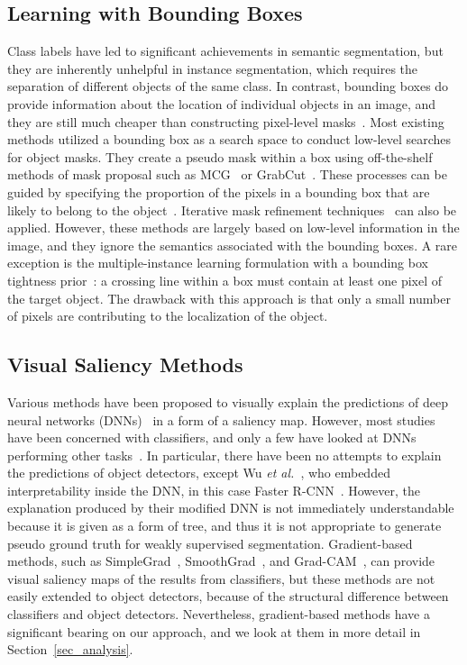 \documentclass[final]{cvpr}
\begin{document}
\subsection{Learning with Bounding Boxes}\label{W_boxes}
Class labels have led to significant achievements in semantic segmentation, but they are inherently unhelpful in instance segmentation, which requires the separation of different objects of the same class.
In contrast, bounding boxes do provide information about the location of individual objects in an image, and they are still much cheaper than constructing pixel-level masks~\cite{bellver2019budget}.
Most existing methods utilized a bounding box as a search space to conduct low-level searches for object masks.
They create a pseudo mask within a box using off-the-shelf methods of mask proposal such as MCG~\cite{pont2016multiscale} or GrabCut~\cite{rother2004grabcut}. 
These processes can be guided by specifying the proportion of the pixels in a bounding box that are likely to belong to the object~\cite{song2019box, kulharia12356box2seg}. Iterative mask refinement techniques~\cite{dai2015boxsup} can also be applied.
However, these methods are largely based on low-level information in the image, and they ignore the semantics associated with the bounding boxes.
A rare exception is the multiple-instance learning formulation with a bounding box tightness prior~\cite{hsu2019weakly}: a crossing line within a box must contain at least one pixel of the target object.
The drawback with this approach is that only a small number of pixels are contributing to the localization of the object.


\vspace{-0.2em}
\subsection{Visual Saliency Methods}\label{XAI} 
\vspace{-0.2em}
Various methods have been proposed to visually explain the predictions of deep neural networks (DNNs)~\cite{fong2017interpretable, fong2019understanding, chang2018explaining, schulz2020restricting, zhou2016learning} in a form of a saliency map.
However, most studies have been concerned with classifiers, and only a few have looked at DNNs performing other tasks~\cite{hoyer2019grid, reif2019visualizing}. In particular, there have been no attempts to explain the predictions of object detectors, except Wu \textit{et al.}~\cite{wu2019towards}, who embedded interpretability inside the DNN, in this case Faster R-CNN~\cite{ren2015faster}. 
However, the explanation produced by their modified DNN is not immediately understandable because it is given as a form of tree, and thus it is not appropriate to generate pseudo ground truth for weakly supervised segmentation.
Gradient-based methods, such as SimpleGrad~\cite{zeiler2014visualizing}, SmoothGrad~\cite{smilkov2017smoothgrad}, and Grad-CAM~\cite{selvaraju2017grad}, can provide visual saliency maps of the results from classifiers, 
but these methods are not easily extended to object detectors, because of the structural difference between classifiers and object detectors. Nevertheless, gradient-based methods have a significant bearing on our approach, and we look at them in more detail in Section~\ref{sec_analysis}.
\end{document}
